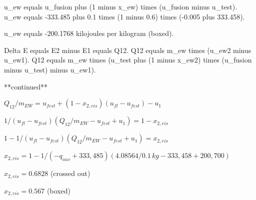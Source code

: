 u_ew equals u_fusion plus (1 minus x_ew) times (u_fusion minus u_test).  
u_ew equals -333.485 plus 0.1 times (1 minus 0.6) times (-0.005 plus 333.458).  

u_ew equals -200.1768 kilojoules per kilogram (boxed).  

Delta E equals E2 minus E1 equals Q12.  
Q12 equals m_ew times (u_ew2 minus u_ew1).  
Q12 equals m_ew times (u_test plus (1 minus x_ew2) times (u_fusion minus u_test) minus u_ew1).

**continued**  

\( Q_{12} / m_{EW} = u_{fest} + (1 - x_{2,eis})(u_{fl} - u_{fest}) - u_1 \)  

\( 1 / (u_{fl} - u_{fest}) \left( Q_{12} / m_{EW} - u_{fest} + u_1 \right) = 1 - x_{2,eis} \)  

\( 1 - 1 / (u_{fl} - u_{fest}) \left( Q_{12} / m_{EW} - u_{fest} + u_1 \right) = x_{2,eis} \)  

\( x_{2,eis} = 1 - 1 / (-q_{aus} + 333,485) \left( 4.08564 / 0.1 \, kg - 333,458 + 200,700 \right) \)  

\( x_{2,eis} = 0.6828 \) (crossed out)  

\( x_{2,eis} = 0.567 \) (boxed)